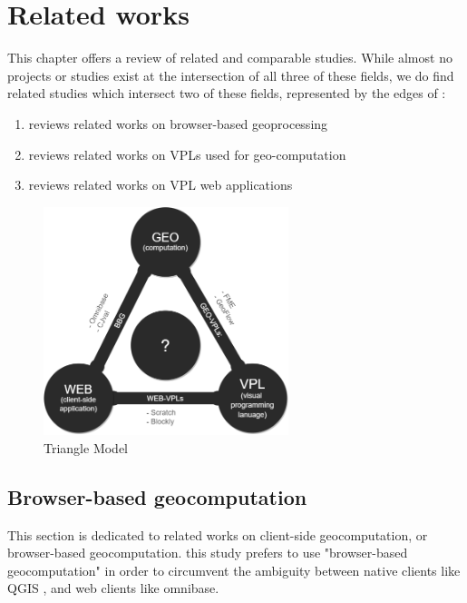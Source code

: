 \chapter{Related works}
\label{chap:related}

This chapter offers a review of related and comparable studies.
While almost no projects or studies exist at the intersection of all three of these fields, we do find related studies which intersect two of these fields, represented by the edges of :
\begin{enumerate}[-]
  \item {} reviews related works on browser-based geoprocessing
  \item {} reviews related works on VPLs used for geo-computation
  \item {} reviews related works on VPL web applications
\end{enumerate}

\begin{figure}
  \centering
  \graphicspath{ {../../assets/diagrams/} }
  \includegraphics[width=270px]{geo-web-vpl.png}
  \caption{Triangle Model}
  \label{fig:triangle-model}
\end{figure}

\section{Browser-based geocomputation}
\label{sec:related-geoweb}

This section is dedicated to related works on client-side geocomputation, or browser-based geocomputation. 
this study prefers to use "browser-based geocomputation" in order to circumvent the ambiguity between native clients like QGIS \cite{qgis_community_qgis_2022}, and web clients like omnibase.

